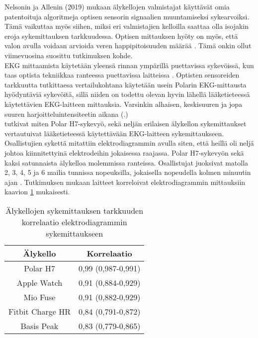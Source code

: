 \documentclass[utf8,bachelor,finnish]{bachelor}
\begin{document}
      
      Nelsonin ja Allenin (2019) mukaan älykellojen valmistajat käyttävät omia patentoituja algoritmeja optisen sensorin
       signaalien muuntamiseksi sykearvoiksi. Tämä vaikuttaa myös siihen, miksi eri valmistajien kelloilla saattaa olla isojakin eroja
        sykemittauksen tarkkuudessa. Optisen mittauksen hyöty on myös, että valon avulla voidaan arvioida veren happipitoisuuden määrää \parencite{noauthor_heart_nodate}.
         Tämä onkin ollut viimevuosina suosittu tutkimuksen kohde.\\


      
  EKG mittaamista käytetään yleensä rinnan ympärillä puettavissa sykevöissä, kun taas optista tekniikkaa ranteessa puettavissa laitteissa \parencite{noauthor_heart_nodate}.
   Optisten sensoreiden tarkkuutta tutkittaesa vertailukohtana käytetään usein Polarin EKG-mittausta hyödyntäviä sykevöitä, sillä niiden on todettu olevan hyvin lähellä
    lääketieteessä käytettävien EKG-laitteen mittauksia. Varsinkin alhaisen, keskisuuren ja jopa suuren harjoitteluintensiteetin aikana
     (\cite{gilgen-ammann_rr_2019, nelson_accuracy_2019}.) \\


   \textcite{wang_accuracy_2017} tutkivat miten Polar H7-sykevyö, sekä neljän erilaisen älykellon sykemittaukset vertautuivat lääketieteessä käytettävään
    EKG-laitteen sykemittaukseen. Osallistujien sykettä mitattiin elektrodiagrammin avulla siten,
     että heillä oli neljä johtoa kiinnitettyinä elektrodeihin jokaisessa raajassa. Polar H7-sykevyön sekä kaksi satunnaista älykelloa molemmissa ranteissa.
      Osallistujat juoksivat matolla 2, 3, 4, 5 ja 6 mailia tunnissa nopeuksilla, jokaisella nopeudella kolmen minuutin ajan \parencite{wang_accuracy_2017}.
       Tutkimuksen mukaan laitteet korreloivat elektrodiagrammin mittauksiin kaavion \ref{table:wang} mukaisesti.\\


  \begin{table}[H]
    \begin{center}
      \begin{tabular}{||c c||} 
       \hline
       Älykello & Korrelaatio\\
       \hline\hline
       Polar H7 & 0,99 (0,987-0,991)\\
       \hline
      Apple Watch & 0,91 (0,884-0,929)\\
      \hline
      Mio Fuse & 0,91 (0,882-0,929)\\
      \hline
      Fitbit Charge HR & 0,84 (0,791-0,872)\\
      \hline
      Basis Peak & 0,83 (0,779-0,865)\\[0.5ex]
      \hline
      \end{tabular}
    \caption{Älykellojen sykemittauksen tarkkuuden korrelaatio elektrodiagrammin sykemittaukseen \parencite{wang_accuracy_2017}}
    \label{table:wang}
      \end{center}
    \end{table}
\end{document}
